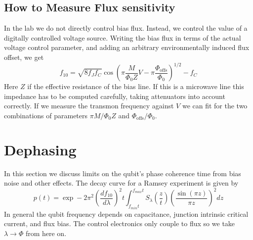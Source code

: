 \documentclass[twocolumn]{article}
\begin{document}
\subsection{How to Measure Flux sensitivity}
In the lab we do not directly control bias flux. Instead, we control the value of a digitally controlled voltage source.
Writing the bias flux in terms of the actual voltage control parameter, and adding an arbitrary environmentally induced flux offset, we get \begin{equation}
f_{10} = \sqrt{8 f_J f_C} \cos \left( \pi \frac{M}{\Phi_0 Z} V - \pi \frac{\Phi_{\textrm{offs}}}{\Phi_0} \right)^{1/2} - f_C \end{equation}
Here $Z$ if the effective resistance of the bias line. If this is a microwave line this impedance has to be computed carefully, taking attenuators into account correctly. If we measure the transmon frequency against $V$ we can fit for the two combinations of parameters $\pi M / \Phi_0 Z$ and $\Phi_{\textrm{offs}} / \Phi_0$.


\section{Dephasing}

In this section we discuss limits on the qubit's phase coherence time from bias noise and other effects. The decay curve for a Ramsey experiment is given by \begin{equation}
p(t) = \exp -2\pi^2 \left( \frac{df_{10}}{d\lambda} \right)^2 t \int_{f_{min}t}^{f_{max}t}S_{\lambda}\left(\frac{z}{t}\right)\left( \frac{\sin(\pi z)}{\pi z} \right)^2 dz \label{eq:ramseyDecay} \end{equation}
In general the qubit frequency depends on capacitance, junction intrinsic critical current, and flux bias. The control electronics only couple to flux so we take $\lambda \rightarrow \Phi$ from here on.
\end{document}
